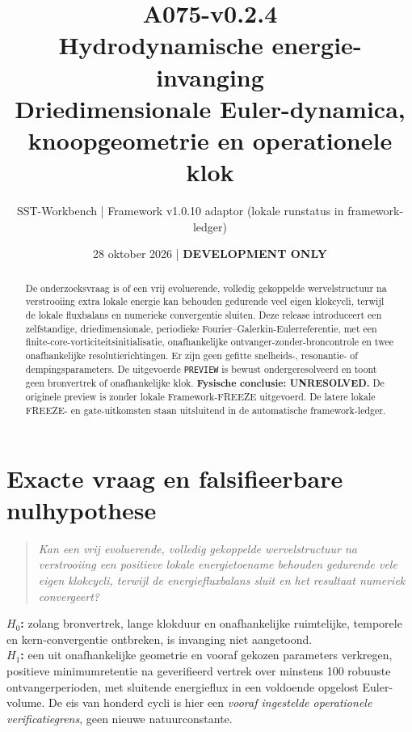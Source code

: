 \documentclass[10pt,a4paper]{article}
\title{\textcolor{main}{A075-v0.2.4}\\Hydrodynamische energie-invanging\\\large Driedimensionale Euler-dynamica, knoopgeometrie en operationele klok}
\author{SST-Workbench | Framework v1.0.10 adaptor (lokale runstatus in framework-ledger)}
\date{28 oktober 2026 | \textbf{DEVELOPMENT ONLY}}
\begin{document}
\maketitle
\begin{abstract}
De onderzoeksvraag is of een vrij evoluerende, volledig gekoppelde wervelstructuur na verstrooiing extra lokale energie kan behouden gedurende veel eigen klokcycli, terwijl de lokale fluxbalans en numerieke convergentie sluiten. Deze release introduceert een zelfstandige, driedimensionale, periodieke Fourier--Galerkin-Eulerreferentie, met een finite-core-vorticiteitsinitialisatie, onafhankelijke ontvanger-zonder-broncontrole en twee onafhankelijke resolutierichtingen. Er zijn geen gefitte snelheids-, resonantie- of dempingsparameters. De uitgevoerde \texttt{PREVIEW} is bewust ondergeresolveerd en toont geen bronvertrek of onafhankelijke klok. \textbf{Fysische conclusie: UNRESOLVED.} De originele preview is zonder lokale Framework-FREEZE uitgevoerd. De latere lokale FREEZE- en gate-uitkomsten staan uitsluitend in de automatische framework-ledger.
\end{abstract}
\section{Exacte vraag en falsifieerbare nulhypothese}
\begin{quote}\emph{Kan een vrij evoluerende, volledig gekoppelde wervelstructuur na verstrooiing een positieve lokale energietoename behouden gedurende vele eigen klokcycli, terwijl de energiefluxbalans sluit en het resultaat numeriek convergeert?}\end{quote}
\textbf{$H_0$:} zolang bronvertrek, lange klokduur en onafhankelijke ruimtelijke, temporele en kern-convergentie ontbreken, is invanging niet aangetoond.\\
\textbf{$H_1$:} een uit onafhankelijke geometrie en vooraf gekozen parameters verkregen, positieve minimumretentie na geverifieerd vertrek over minstens 100 robuuste ontvangerperioden, met sluitende energieflux in een voldoende opgelost Euler-volume.
De eis van honderd cycli is hier een \emph{vooraf ingestelde operationele verificatiegrens}, geen nieuwe natuurconstante.
\end{document}
